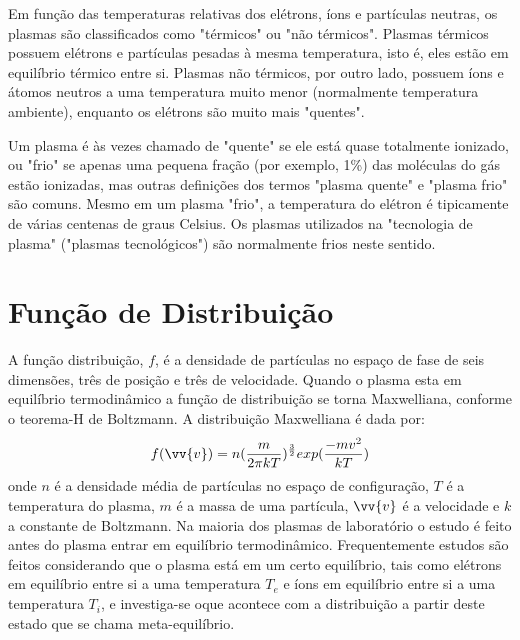 \documentclass[12pt,oneside,a4paper]{abntex2}
\theoremstyle{definition}  %
\begin{document}
Em função das temperaturas relativas dos elétrons, íons e partículas neutras, os plasmas são classificados como "térmicos" ou "não térmicos". Plasmas térmicos possuem elétrons e partículas pesadas à mesma temperatura, isto é, eles estão em equilíbrio térmico entre si. Plasmas não térmicos, por outro lado, possuem íons e átomos neutros a uma temperatura muito menor (normalmente temperatura ambiente), enquanto os elétrons são muito mais "quentes".

Um plasma é às vezes chamado de "quente" se ele está quase totalmente ionizado, ou "frio" se apenas uma pequena fração (por exemplo, 1\%) das moléculas do gás estão ionizadas, mas outras definições dos termos "plasma quente" e "plasma frio" são comuns. Mesmo em um plasma "frio", a temperatura do elétron é tipicamente de várias centenas de graus Celsius. Os plasmas utilizados na "tecnologia de plasma" ("plasmas tecnológicos") são normalmente frios neste sentido. 

\section{Função de Distribuição}
A função distribuição, $f$, é a densidade de partículas no espaço de fase de seis dimensões, três de posição e três de velocidade. Quando o plasma esta em equilíbrio termodinâmico a função de distribuição se torna Maxwelliana, conforme o teorema-H de Boltzmann. A distribuição Maxwelliana é dada por:
\begin{equation}
    f(\vv{v}) = n (\frac{m}{2\pi k T})^{\frac{3}{2}}exp(\frac{-mv^2}{kT})
\end{equation}
onde $n$ é a densidade média de partículas no espaço de configuração, $T$ é a temperatura do plasma, $m$ é a massa de uma partícula, $\vv{v}$ é a velocidade e $k$ a constante de Boltzmann.
Na maioria dos plasmas de laboratório o estudo é feito antes do plasma entrar em equilíbrio termodinâmico. Frequentemente estudos são feitos considerando que o plasma está em um certo equilíbrio, tais como elétrons em equilíbrio entre si a uma temperatura $T_e$ e íons em equilíbrio entre si a uma temperatura $T_i$, e investiga-se oque acontece com a distribuição a partir deste estado que se chama meta-equilíbrio.
\end{document}

